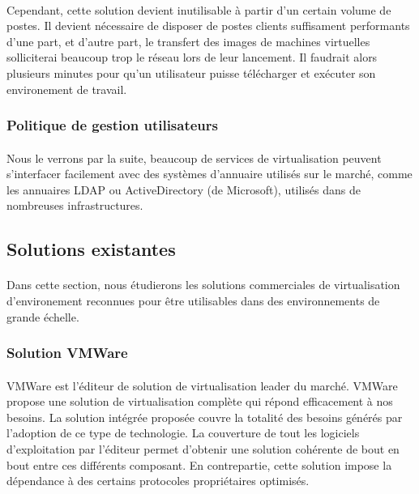 \paragraph{} Cependant, cette solution devient inutilisable à partir d'un
certain volume de postes. Il devient nécessaire de disposer de postes clients
suffisament performants d'une part, et d'autre part, le transfert des images de
machines virtuelles solliciterai beaucoup trop le réseau lors de leur lancement.
Il faudrait alors plusieurs minutes pour qu'un utilisateur puisse télécharger et
exécuter son environement de travail.

\subsubsection{Politique de gestion utilisateurs}

\paragraph{} Nous le verrons par la suite, beaucoup de services de
virtualisation peuvent s'interfacer facilement avec des systèmes d'annuaire
utilisés sur le marché, comme les annuaires LDAP ou ActiveDirectory (de
Microsoft), utilisés dans de nombreuses infrastructures.

\subsection{Solutions existantes}

\paragraph{} Dans cette section, nous étudierons les solutions commerciales de virtualisation d'environement reconnues pour être utilisables
dans des environnements de grande échelle.

\subsubsection{Solution VMWare}

\paragraph{} VMWare est l'éditeur de solution de virtualisation leader du
marché. VMWare propose une solution de virtualisation complète qui répond
efficacement à nos besoins. La solution intégrée proposée couvre la totalité des
besoins générés par l'adoption de ce type de technologie. La couverture de tout
les logiciels d'exploitation par l'éditeur permet d'obtenir une solution
cohérente de bout en bout entre ces différents composant. En contrepartie, cette
solution impose la dépendance à des certains protocoles propriétaires optimisés.


